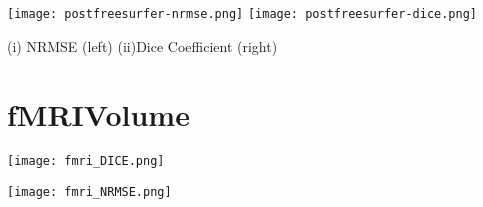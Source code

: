 \begin{center}
\texttt{[image: postfreesurfer-nrmse.png]}%
\texttt{[image: postfreesurfer-dice.png]}
\caption*{(i) NRMSE (left) (ii)Dice Coefficient (right)}
\label{fig:postfreesurfer_metric_values}
\end{center}

\section{fMRIVolume}\label{sec:fMRI}
\begin{center}
  \texttt{[image: fmri\_DICE.png]}
   \label{fig:fMRI_Dice}
\end{center}

\begin{center}
  \texttt{[image: fmri\_NRMSE.png]}
   \label{fig:fMRI_NRMSE}
\end{center}
